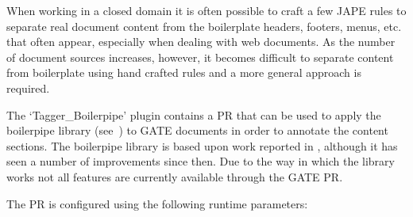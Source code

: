 When working in a closed domain it is often possible to craft a few JAPE rules to separate real document content from the boilerplate headers, footers, menus, etc. that often
appear, especially when dealing with web documents. As the number of document sources increases, however, it becomes difficult to separate content from boilerplate using
hand crafted rules and a more general approach is required.

The `Tagger\_Boilerpipe' plugin contains a PR that can be used to apply the boilerpipe library (see~) to GATE documents in
order to annotate the content sections. The boilerpipe library is based upon work reported in \cite{boilerpipe2010}, although it has seen a number of improvements since then.
Due to the  way in which the library works not all features are currently available through the GATE PR.

The PR is configured using the following runtime parameters:

